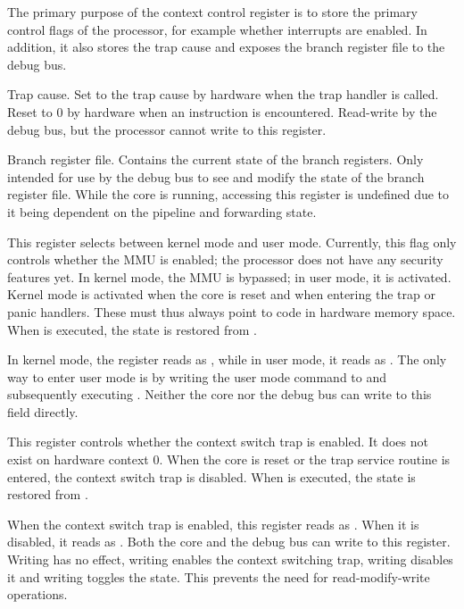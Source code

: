 The primary purpose of the context control register is to store the primary
control flags of the processor, for example whether interrupts are enabled. In
addition, it also stores the trap cause and exposes the branch register file to
the debug bus.

\debugCanWrite{}
Trap cause. Set to the trap cause by hardware when the trap handler is called. 
Reset to 0 by hardware when an  instruction is encountered. Read-write 
by the debug bus, but the processor cannot write to this register.

\debugCanWrite{}
Branch register file. Contains the current state of the branch registers. Only
intended for use by the debug bus to see and modify the state of the branch
register file. While the core is running, accessing this register is undefined
due to it being dependent on the pipeline and forwarding state.

This register selects between kernel mode and user mode. Currently, this flag 
only controls whether the MMU is enabled; the \rvex{} processor does not have 
any security features yet. In kernel mode, the MMU is bypassed; in user mode, it 
is activated. Kernel mode is activated when the core is reset and when entering 
the trap or panic handlers. These must thus always point to code in hardware 
memory space. When  is executed, the state is restored from
.

In kernel mode, the register reads as , while in user mode, it reads as 
. The only way to enter user mode is by writing the user mode command 
to  and subsequently executing . Neither the core nor the 
debug bus can write to this field directly.

\debugCanWrite{}
\coreCanWrite{}
This register controls whether the context switch trap is enabled. It does not 
exist on hardware context 0. When the core is reset or the trap service routine 
is entered, the context switch trap is disabled. When  is executed, 
the state is restored from .

When the context switch trap is enabled, this register reads as . When 
it is disabled, it reads as . Both the core and the debug bus can write 
to this register. Writing  has no effect, writing  enables the 
context switching trap, writing  disables it and writing  
toggles the state. This prevents the need for read-modify-write operations.

